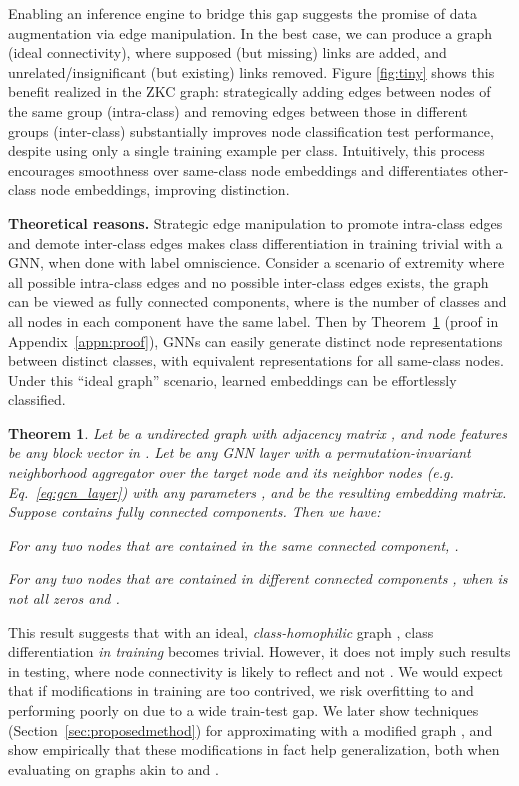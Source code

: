 \documentclass[letterpaper]{article} \usepackage{aaai21}  \usepackage{times}  \usepackage{helvet} \usepackage{courier}  \usepackage[hyphens]{url}  \usepackage{graphicx} \urlstyle{rm} \def\UrlFont{\rm}  \usepackage{natbib}  \usepackage{caption} \frenchspacing  \setlength{\pdfpagewidth}{8.5in}  \setlength{\pdfpageheight}{11in}
\newtheorem{theorem}{Theorem}\newtheorem{corollary}[theorem]{Corollary}
\begin{document}
Enabling an inference engine to bridge this gap suggests the promise of data augmentation via edge manipulation. In the best case, we can produce a graph  (ideal connectivity), where supposed (but missing) links are added, and unrelated/insignificant (but existing) links removed. Figure \ref{fig:tiny} shows this benefit realized in the ZKC graph: strategically adding edges between nodes of the same group (intra-class) and removing edges between those in different groups (inter-class) substantially improves node classification test performance, despite using only a single training example per class.  Intuitively, this process encourages smoothness over same-class node embeddings and differentiates other-class node embeddings, improving distinction.

\noindent \textbf{Theoretical reasons.} \label{sec:edgemanip_theory} Strategic edge manipulation to promote intra-class edges and demote inter-class edges makes class differentiation in training trivial with a GNN, when done with label omniscience.  Consider a scenario of extremity where all possible intra-class edges and no possible inter-class edges exists, the graph can be viewed as  fully connected components, where  is the number of classes and all nodes in each component have the same label. 
Then by Theorem~\ref{thm:1} (proof in Appendix~\ref{appn:proof}), GNNs can easily generate distinct node representations between distinct classes, with equivalent representations for all same-class nodes. Under this ``ideal graph'' scenario, learned embeddings can be effortlessly classified.

\begin{theorem}
\label{thm:1}
Let  be a undirected graph with adjacency matrix , and node features  be any block vector in . Let  be any GNN layer with a permutation-invariant neighborhood aggregator over the target node and its neighbor nodes  (e.g. Eq.~\ref{eq:gcn_layer}) with any parameters , and  be the resulting embedding matrix. Suppose  contains  fully connected components. Then we have:
\begin{compactenum}
    \item For any two nodes  that are contained in the same connected component, .
    \item For any two nodes  that are contained in different connected components ,  when  is not all zeros and .
\end{compactenum}
\end{theorem}

This result suggests that with an ideal, \emph{class-homophilic} graph , class differentiation \emph{in training} becomes trivial.  However, it does not imply such results in testing, where node connectivity is likely to reflect  and not .
We would expect that if modifications in training are too contrived, we risk overfitting to  and performing poorly on  due to a wide train-test gap.  We later show techniques (Section~\ref{sec:proposedmethod}) for approximating  with a modified graph , and show empirically that these modifications in fact help generalization, both when evaluating on graphs akin to  and .
\end{document}
